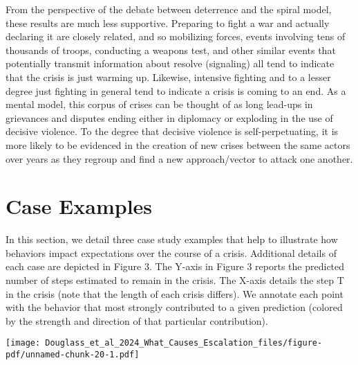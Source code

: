 \documentclass[
  letterpaper,
  DIV=11,
  numbers=noendperiod]{scrartcl}
\begin{document}
From the perspective of the debate between deterrence and the spiral
model, these results are much less supportive. Preparing to fight a war
and actually declaring it are closely related, and so mobilizing forces,
events involving tens of thousands of troops, conducting a weapons test,
and other similar events that potentially transmit information about
resolve (signaling) all tend to indicate that the crisis is just warming
up. Likewise, intensive fighting and to a lesser degree just fighting in
general tend to indicate a crisis is coming to an end. As a mental
model, this corpus of crises can be thought of as long lead-ups in
grievances and disputes ending either in diplomacy or exploding in the
use of decisive violence. To the degree that decisive violence is
self-perpetuating, it is more likely to be evidenced in the creation of
new crises between the same actors over years as they regroup and find a
new approach/vector to attack one another.

\section{Case Examples}\label{case-examples}

In this section, we detail three case study examples that help to
illustrate how behaviors impact expectations over the course of a
crisis. Additional details of each case are depicted in Figure 3. The
Y-axis in Figure 3 reports the predicted number of steps estimated to
remain in the crisis. The X-axis details the step T in the crisis (note
that the length of each crisis differs). We annotate each point with the
behavior that most strongly contributed to a given prediction (colored
by the strength and direction of that particular contribution).

\texttt{[image: Douglass\_et\_al\_2024\_What\_Causes\_Escalation\_files/figure-pdf/unnamed-chunk-20-1.pdf]}
\end{document}

